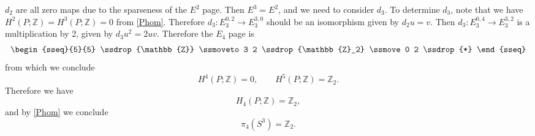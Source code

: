 \documentclass[12pt]{article}
\numberwithin{equation}{section}
\numberwithin{figure}{section}
\theoremstyle{remark}
\def\bZ{\mathbb{Z}}
\begin{document}
$d_2$ are all zero maps due to the sparseness of the $E^2$ page.
Then $E^3=E^2$, and we need  to consider  $d_3$.
To determine $d_3$, note that we have $H^2(P;\bZ)=H^3(P;\bZ)=0$ from \eqref{Phom}.
Therefore $d_3: E_3^{0,2}\to E_3^{3,0}$ should be an isomorphism given by $d_2 u=v$.
Then $d_3 : E_3^{0,4}\to E_3^{3,2}$ is a multiplication by 2, given by $d_3 u^2 = 2uv$.
Therefore the $E_4$ page is \begin{equation}
  \vcenter{\hbox{\begin{sseq}{5}{5}
    \ssdrop{\bZ}
    \ssmoveto 3 2 \ssdrop{\bZ_2} 
    \ssmove 0 2 \ssdrop{*} 
  \end{sseq}}}  
\end{equation}
from which we conclude \begin{equation}
H^4(P;\bZ)=0, \qquad H^5(P;\bZ)=\bZ_2.
\end{equation}
Therefore we have \begin{equation}
H_4(P;\bZ)=\bZ_2,
\end{equation} and by \eqref{Phom} we conclude \begin{equation}
\pi_4(S^3)=\bZ_2.
\end{equation}


%







\end{document}
